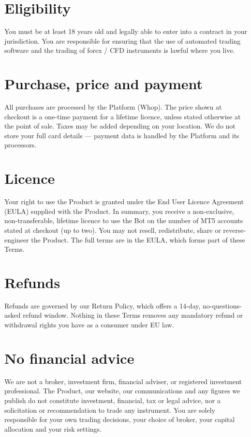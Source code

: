 \documentclass[11pt,a4paper]{article}
\begin{document}
\section{Eligibility}
You must be at least 18 years old and legally able to enter into a contract in your jurisdiction.
You are responsible for ensuring that the use of automated trading software and the trading of
forex / CFD instruments is lawful where you live.

\section{Purchase, price and payment}
All purchases are processed by the Platform (Whop). The price shown at checkout is a one-time
payment for a lifetime licence, unless stated otherwise at the point of sale. Taxes may be added
depending on your location. We do not store your full card details --- payment data is handled by
the Platform and its processors.

\section{Licence}
Your right to use the Product is granted under the End User Licence Agreement (EULA) supplied with
the Product. In summary, you receive a non-exclusive, non-transferable, lifetime licence to use the
Bot on the number of MT5 accounts stated at checkout (up to two). You may not resell, redistribute,
share or reverse-engineer the Product. The full terms are in the EULA, which forms part of these
Terms.

\section{Refunds}
Refunds are governed by our Return Policy, which offers a 14-day, no-questions-asked refund window.
Nothing in these Terms removes any mandatory refund or withdrawal rights you have as a consumer
under EU law.

\section{No financial advice}
We are not a broker, investment firm, financial adviser, or registered investment professional. The
Product, our website, our communications and any figures we publish do not constitute investment,
financial, tax or legal advice, nor a solicitation or recommendation to trade any instrument. You
are solely responsible for your own trading decisions, your choice of broker, your capital
allocation and your risk settings.
\end{document}
